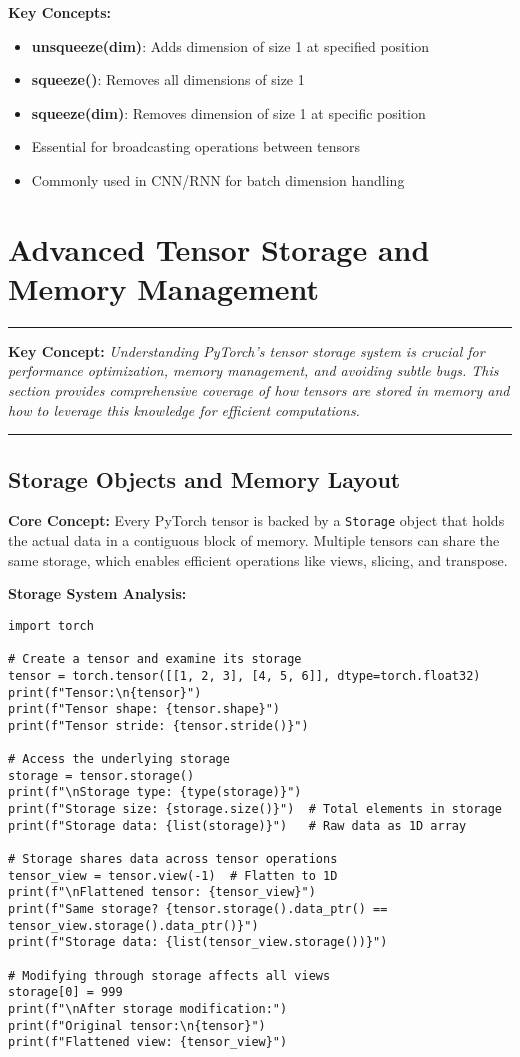\documentclass[11pt,a4paper]{book}
\newenvironment{keybox}
{\begin{center}
\begin{minipage}{0.9\textwidth}
\vspace{0.3em}
\hrule height 0.8pt
\vspace{0.5em}
\textbf{Key Concept:} \itshape}
{\vspace{0.5em}
\hrule height 0.8pt
\vspace{0.3em}
\end{minipage}
\end{center}}
\begin{document}
\textbf{Key Concepts:}
\begin{itemize}
    \item \textbf{unsqueeze(dim)}: Adds dimension of size 1 at specified position
    \item \textbf{squeeze()}: Removes all dimensions of size 1
    \item \textbf{squeeze(dim)}: Removes dimension of size 1 at specific position
    \item Essential for broadcasting operations between tensors
    \item Commonly used in CNN/RNN for batch dimension handling
\end{itemize}

\section{Advanced Tensor Storage and Memory Management}

\begin{keybox}
Understanding PyTorch's tensor storage system is crucial for performance optimization, memory management, and avoiding subtle bugs. This section provides comprehensive coverage of how tensors are stored in memory and how to leverage this knowledge for efficient computations.
\end{keybox}

\subsection{Storage Objects and Memory Layout}

\textbf{Core Concept:} Every PyTorch tensor is backed by a \texttt{Storage} object that holds the actual data in a contiguous block of memory. Multiple tensors can share the same storage, which enables efficient operations like views, slicing, and transpose.

\textbf{Storage System Analysis:}
\begin{verbatim}
import torch

# Create a tensor and examine its storage
tensor = torch.tensor([[1, 2, 3], [4, 5, 6]], dtype=torch.float32)
print(f"Tensor:\n{tensor}")
print(f"Tensor shape: {tensor.shape}")
print(f"Tensor stride: {tensor.stride()}")

# Access the underlying storage
storage = tensor.storage()
print(f"\nStorage type: {type(storage)}")
print(f"Storage size: {storage.size()}")  # Total elements in storage
print(f"Storage data: {list(storage)}")   # Raw data as 1D array

# Storage shares data across tensor operations
tensor_view = tensor.view(-1)  # Flatten to 1D
print(f"\nFlattened tensor: {tensor_view}")
print(f"Same storage? {tensor.storage().data_ptr() == tensor_view.storage().data_ptr()}")
print(f"Storage data: {list(tensor_view.storage())}")

# Modifying through storage affects all views
storage[0] = 999
print(f"\nAfter storage modification:")
print(f"Original tensor:\n{tensor}")
print(f"Flattened view: {tensor_view}")
\end{verbatim}
\end{document}
